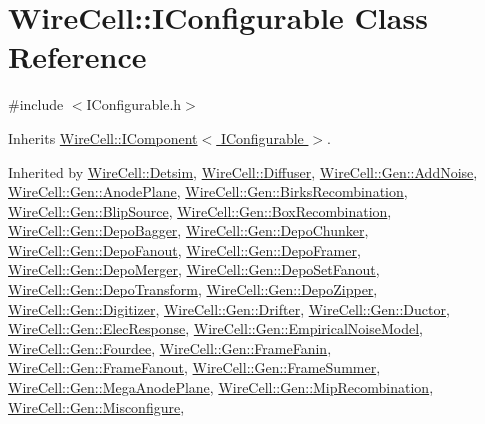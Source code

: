 \hypertarget{class_wire_cell_1_1_i_configurable}{}\section{Wire\+Cell\+:\+:I\+Configurable Class Reference}
\label{class_wire_cell_1_1_i_configurable}


{\ttfamily \#include $<$I\+Configurable.\+h$>$}



Inherits \hyperlink{class_wire_cell_1_1_i_component}{Wire\+Cell\+::\+I\+Component$<$ I\+Configurable $>$}.



Inherited by \hyperlink{class_wire_cell_1_1_detsim}{Wire\+Cell\+::\+Detsim}, \hyperlink{class_wire_cell_1_1_diffuser}{Wire\+Cell\+::\+Diffuser}, \hyperlink{class_wire_cell_1_1_gen_1_1_add_noise}{Wire\+Cell\+::\+Gen\+::\+Add\+Noise}, \hyperlink{class_wire_cell_1_1_gen_1_1_anode_plane}{Wire\+Cell\+::\+Gen\+::\+Anode\+Plane}, \hyperlink{class_wire_cell_1_1_gen_1_1_birks_recombination}{Wire\+Cell\+::\+Gen\+::\+Birks\+Recombination}, \hyperlink{class_wire_cell_1_1_gen_1_1_blip_source}{Wire\+Cell\+::\+Gen\+::\+Blip\+Source}, \hyperlink{class_wire_cell_1_1_gen_1_1_box_recombination}{Wire\+Cell\+::\+Gen\+::\+Box\+Recombination}, \hyperlink{class_wire_cell_1_1_gen_1_1_depo_bagger}{Wire\+Cell\+::\+Gen\+::\+Depo\+Bagger}, \hyperlink{class_wire_cell_1_1_gen_1_1_depo_chunker}{Wire\+Cell\+::\+Gen\+::\+Depo\+Chunker}, \hyperlink{class_wire_cell_1_1_gen_1_1_depo_fanout}{Wire\+Cell\+::\+Gen\+::\+Depo\+Fanout}, \hyperlink{class_wire_cell_1_1_gen_1_1_depo_framer}{Wire\+Cell\+::\+Gen\+::\+Depo\+Framer}, \hyperlink{class_wire_cell_1_1_gen_1_1_depo_merger}{Wire\+Cell\+::\+Gen\+::\+Depo\+Merger}, \hyperlink{class_wire_cell_1_1_gen_1_1_depo_set_fanout}{Wire\+Cell\+::\+Gen\+::\+Depo\+Set\+Fanout}, \hyperlink{class_wire_cell_1_1_gen_1_1_depo_transform}{Wire\+Cell\+::\+Gen\+::\+Depo\+Transform}, \hyperlink{class_wire_cell_1_1_gen_1_1_depo_zipper}{Wire\+Cell\+::\+Gen\+::\+Depo\+Zipper}, \hyperlink{class_wire_cell_1_1_gen_1_1_digitizer}{Wire\+Cell\+::\+Gen\+::\+Digitizer}, \hyperlink{class_wire_cell_1_1_gen_1_1_drifter}{Wire\+Cell\+::\+Gen\+::\+Drifter}, \hyperlink{class_wire_cell_1_1_gen_1_1_ductor}{Wire\+Cell\+::\+Gen\+::\+Ductor}, \hyperlink{class_wire_cell_1_1_gen_1_1_elec_response}{Wire\+Cell\+::\+Gen\+::\+Elec\+Response}, \hyperlink{class_wire_cell_1_1_gen_1_1_empirical_noise_model}{Wire\+Cell\+::\+Gen\+::\+Empirical\+Noise\+Model}, \hyperlink{class_wire_cell_1_1_gen_1_1_fourdee}{Wire\+Cell\+::\+Gen\+::\+Fourdee}, \hyperlink{class_wire_cell_1_1_gen_1_1_frame_fanin}{Wire\+Cell\+::\+Gen\+::\+Frame\+Fanin}, \hyperlink{class_wire_cell_1_1_gen_1_1_frame_fanout}{Wire\+Cell\+::\+Gen\+::\+Frame\+Fanout}, \hyperlink{class_wire_cell_1_1_gen_1_1_frame_summer}{Wire\+Cell\+::\+Gen\+::\+Frame\+Summer}, \hyperlink{class_wire_cell_1_1_gen_1_1_mega_anode_plane}{Wire\+Cell\+::\+Gen\+::\+Mega\+Anode\+Plane}, \hyperlink{class_wire_cell_1_1_gen_1_1_mip_recombination}{Wire\+Cell\+::\+Gen\+::\+Mip\+Recombination}, \hyperlink{class_wire_cell_1_1_gen_1_1_misconfigure}{Wire\+Cell\+::\+Gen\+::\+Misconfigure}, 